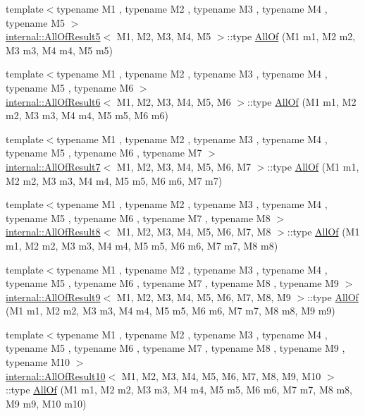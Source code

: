 \begin{DoxyCompactItemize}
\item 
{\footnotesize template$<$typename M1 , typename M2 , typename M3 , typename M4 , typename M5 $>$ }\\\mbox{\hyperlink{structtesting_1_1internal_1_1_all_of_result5}{internal\+::\+All\+Of\+Result5}}$<$ M1, M2, M3, M4, M5 $>$\+::type \mbox{\hyperlink{namespacetesting_ab8f5e6cf1c22acf51a2b9b376b0ef03a}{All\+Of}} (M1 m1, M2 m2, M3 m3, M4 m4, M5 m5)
\item 
{\footnotesize template$<$typename M1 , typename M2 , typename M3 , typename M4 , typename M5 , typename M6 $>$ }\\\mbox{\hyperlink{structtesting_1_1internal_1_1_all_of_result6}{internal\+::\+All\+Of\+Result6}}$<$ M1, M2, M3, M4, M5, M6 $>$\+::type \mbox{\hyperlink{namespacetesting_afc8e2d405f80e7d3df32842ddb648125}{All\+Of}} (M1 m1, M2 m2, M3 m3, M4 m4, M5 m5, M6 m6)
\item 
{\footnotesize template$<$typename M1 , typename M2 , typename M3 , typename M4 , typename M5 , typename M6 , typename M7 $>$ }\\\mbox{\hyperlink{structtesting_1_1internal_1_1_all_of_result7}{internal\+::\+All\+Of\+Result7}}$<$ M1, M2, M3, M4, M5, M6, M7 $>$\+::type \mbox{\hyperlink{namespacetesting_acbd4eef50126ff6db5b93ac5faa71b45}{All\+Of}} (M1 m1, M2 m2, M3 m3, M4 m4, M5 m5, M6 m6, M7 m7)
\item 
{\footnotesize template$<$typename M1 , typename M2 , typename M3 , typename M4 , typename M5 , typename M6 , typename M7 , typename M8 $>$ }\\\mbox{\hyperlink{structtesting_1_1internal_1_1_all_of_result8}{internal\+::\+All\+Of\+Result8}}$<$ M1, M2, M3, M4, M5, M6, M7, M8 $>$\+::type \mbox{\hyperlink{namespacetesting_a7ec0bc4eca9805e85b9b34bbbf3d3ae2}{All\+Of}} (M1 m1, M2 m2, M3 m3, M4 m4, M5 m5, M6 m6, M7 m7, M8 m8)
\item 
{\footnotesize template$<$typename M1 , typename M2 , typename M3 , typename M4 , typename M5 , typename M6 , typename M7 , typename M8 , typename M9 $>$ }\\\mbox{\hyperlink{structtesting_1_1internal_1_1_all_of_result9}{internal\+::\+All\+Of\+Result9}}$<$ M1, M2, M3, M4, M5, M6, M7, M8, M9 $>$\+::type \mbox{\hyperlink{namespacetesting_aaecf2bd8eb7c68b119f9b81a01942b7f}{All\+Of}} (M1 m1, M2 m2, M3 m3, M4 m4, M5 m5, M6 m6, M7 m7, M8 m8, M9 m9)
\item 
{\footnotesize template$<$typename M1 , typename M2 , typename M3 , typename M4 , typename M5 , typename M6 , typename M7 , typename M8 , typename M9 , typename M10 $>$ }\\\mbox{\hyperlink{structtesting_1_1internal_1_1_all_of_result10}{internal\+::\+All\+Of\+Result10}}$<$ M1, M2, M3, M4, M5, M6, M7, M8, M9, M10 $>$\+::type \mbox{\hyperlink{namespacetesting_a9939c08664efeed0c1983090115f7ecb}{All\+Of}} (M1 m1, M2 m2, M3 m3, M4 m4, M5 m5, M6 m6, M7 m7, M8 m8, M9 m9, M10 m10)

\end{DoxyCompactItemize}
